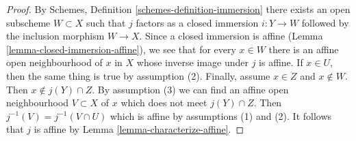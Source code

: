 \begin{proof}
By Schemes, Definition \ref{schemes-definition-immersion} there exists an
open subscheme $W \subset X$ such that $j$ factors as a closed immersion
$i : Y \to W$ followed by the inclusion morphism $W \to X$.
Since a closed immersion is affine
(Lemma \ref{lemma-closed-immersion-affine}),
we see that for every $x \in W$ there is an affine open
neighbourhood of $x$ in $X$ whose inverse image under $j$ is affine.
If $x \in U$, then the same thing is true by assumption (2).
Finally, assume $x \in Z$ and $x \not \in W$. Then $x \not \in j(Y) \cap Z$.
By assumption (3) we can find an affine open neighbourhood
$V \subset X$ of $x$ which does not meet $j(Y) \cap Z$.
Then $j^{-1}(V) = j^{-1}(V \cap U)$ which is affine
by assumptions (1) and (2). It follows that $j$ is affine by
Lemma \ref{lemma-characterize-affine}.
\end{proof}







